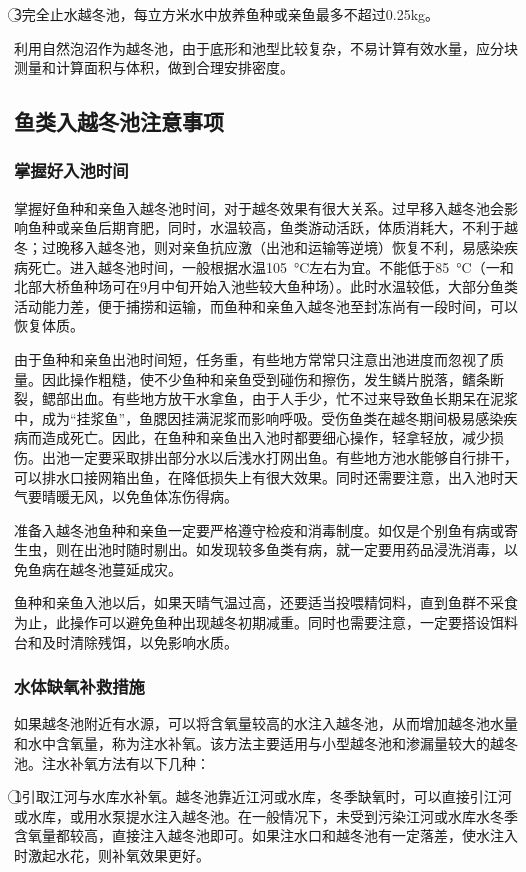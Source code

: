 \documentclass{ctexbook}
\begin{document}
\textcircled{3}完全止水越冬池，每立方米水中放养鱼种或亲鱼最多不超过0.25kg。

利用自然泡沼作为越冬池，由于底形和池型比较复杂，不易计算有效水量，应分块测量和计算面积与体积，做到合理安排密度。

\subsection{鱼类入越冬池注意事项}
\subsubsection{掌握好入池时间}
掌握好鱼种和亲鱼入越冬池时间，对于越冬效果有很大关系。过早移入越冬池会影响鱼种或亲鱼后期育肥，同时，水温较高，鱼类游动活跃，体质消耗大，不利于越冬；过晚移入越冬池，则对亲鱼抗应激（出池和运输等逆境）恢复不利，易感染疾病死亡。进入越冬池时间，一般根据水温10\SI{5}{\degreeCelsius}左右为宜。不能低于8\SI{5}{\degreeCelsius}（一和北部大桥鱼种场可在9月中旬开始入池些较大鱼种场）。此时水温较低，大部分鱼类活动能力差，便于捕捞和运输，而鱼种和亲鱼入越冬池至封冻尚有一段时间，可以恢复体质。

由于鱼种和亲鱼出池时间短，任务重，有些地方常常只注意出池进度而忽视了质量。因此操作粗糙，使不少鱼种和亲鱼受到碰伤和擦伤，发生鳞片脱落，鳍条断裂，鳃部出血。有些地方放干水拿鱼，由于人手少，忙不过来导致鱼长期呆在泥浆中，成为“挂浆鱼”，鱼腮因挂满泥浆而影响呼吸。受伤鱼类在越冬期间极易感染疾病而造成死亡。因此，在鱼种和亲鱼出入池时都要细心操作，轻拿轻放，减少损伤。出池一定要采取排出部分水以后浅水打网出鱼。有些地方池水能够自行排干，可以排水口接网箱出鱼，在降低损失上有很大效果。同时还需要注意，出入池时天气要晴暖无风，以免鱼体冻伤得病。

准备入越冬池鱼种和亲鱼一定要严格遵守检疫和消毒制度。如仅是个别鱼有病或寄生虫，则在出池时随时剔出。如发现较多鱼类有病，就一定要用药品浸洗消毒，以免鱼病在越冬池蔓延成灾。

鱼种和亲鱼入池以后，如果天晴气温过高，还要适当投喂精饲料，直到鱼群不采食为止，此操作可以避免鱼种出现越冬初期减重。同时也需要注意，一定要搭设饵料台和及时清除残饵，以免影响水质。
\subsubsection{水体缺氧补救措施}
如果越冬池附近有水源，可以将含氧量较高的水注入越冬池，从而增加越冬池水量和水中含氧量，称为注水补氧。该方法主要适用与小型越冬池和渗漏量较大的越冬池。注水补氧方法有以下几种：

\textcircled{1}引取江河与水库水补氧。越冬池靠近江河或水库，冬季缺氧时，可以直接引江河或水库，或用水泵提水注入越冬池。在一般情况下，未受到污染江河或水库水冬季含氧量都较高，直接注入越冬池即可。如果注水口和越冬池有一定落差，使水注入时激起水花，则补氧效果更好。
\end{document}
